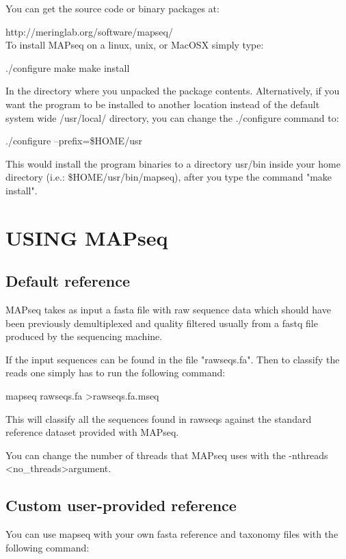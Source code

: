 \documentclass[10pt,a4paper]{article}
\begin{document}
You can get the source code or binary packages at:

http://meringlab.org/software/mapseq/
\\


To install MAPseq on a linux, unix, or MacOSX simply type:

./configure
make
make install

In the directory where you unpacked the package contents.
Alternatively, if you want the program to be installed to another
location instead of the default system wide /usr/local/ directory,
you can change the ./configure command to:

./configure --prefix=\$HOME/usr

This would install the program binaries to a directory usr/bin inside
your home directory (i.e.: \$HOME/usr/bin/mapseq), after you type
the command "make install".



\section{USING MAPseq}

\subsection{Default reference}

MAPseq takes as input a fasta file with raw sequence data which should have been previously
demultiplexed and quality filtered usually from a fastq file produced by the sequencing machine.

If the input sequences can be found in the file "rawseqs.fa". Then to classify the reads
one simply has to run the following command:

mapseq rawseqs.fa \textgreater rawseqs.fa.mseq

This will classify all the sequences found in rawseqs against the standard reference dataset
provided with MAPseq.

You can change the number of threads that MAPseq uses with the -nthreads {\textless}no\_threads\textgreater argument.


\subsection{Custom user-provided reference}

You can use mapseq with your own fasta reference and taxonomy files with the following command:
\end{document}
